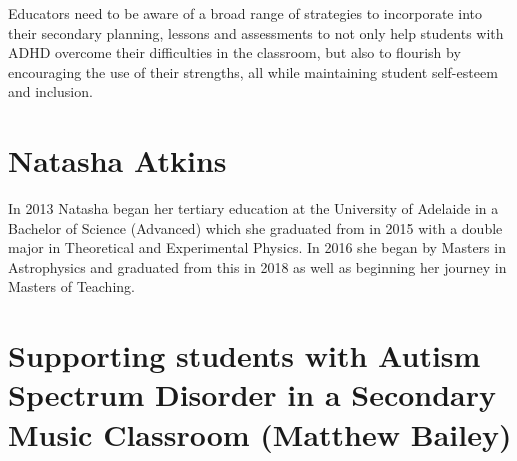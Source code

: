 \documentclass[twoside,14pt,a4paper,notitlepage]{memoir}
\begin{document}
Educators need to be aware of a broad range of strategies to incorporate into their secondary planning, lessons and assessments to not only help students with ADHD overcome their difficulties in the classroom, but also to flourish by encouraging the use of their strengths, all while maintaining student self-esteem and inclusion.

\section*{Natasha Atkins}

In 2013 Natasha began her tertiary education at the University of Adelaide in a Bachelor of Science (Advanced) which she graduated from in 2015 with a double major in Theoretical and Experimental Physics. In 2016 she began by Masters in Astrophysics and graduated from this in 2018 as well as beginning her journey in Masters of Teaching. 



\section*{Supporting students with Autism Spectrum Disorder in a Secondary Music Classroom (Matthew Bailey)}
\label{aut:bailey}
\end{document}
